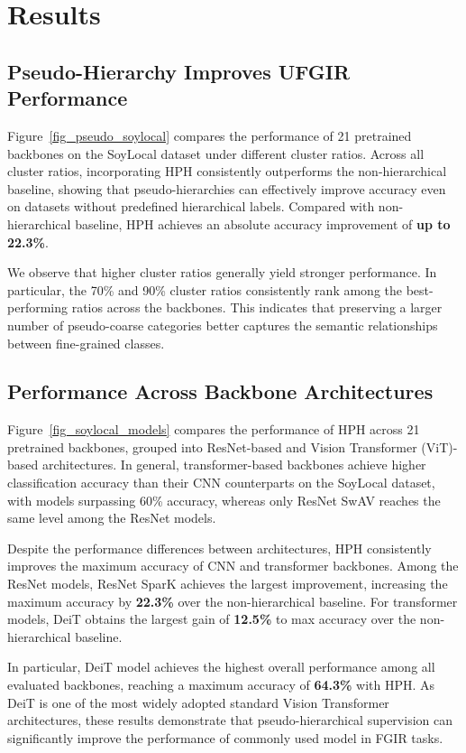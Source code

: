 \documentclass[conference,a4paper]{IEEEtran}
\begin{document}
\section{Results}
\label{sec_results}
\subsection{Pseudo-Hierarchy Improves UFGIR Performance}
Figure~\ref{fig_pseudo_soylocal} compares the performance of 21 pretrained backbones on the SoyLocal dataset under different cluster ratios. Across all cluster ratios, incorporating HPH consistently outperforms the non-hierarchical baseline, showing that pseudo-hierarchies can effectively improve accuracy even on datasets without predefined hierarchical labels. Compared with non-hierarchical baseline, HPH achieves an absolute accuracy improvement of \textbf{up to 22.3\%}.

We observe that higher cluster ratios generally yield stronger performance. In particular, the 70\% and 90\% cluster ratios consistently rank among the best-performing ratios across the backbones. This indicates that preserving a larger number of pseudo-coarse categories better captures the semantic relationships between fine-grained classes.

\subsection{Performance Across Backbone Architectures}
Figure~\ref{fig_soylocal_models} compares the performance of HPH across 21 pretrained backbones, grouped into ResNet-based and Vision Transformer (ViT)-based architectures. In general, transformer-based backbones achieve higher classification accuracy than their CNN counterparts on the SoyLocal dataset, with models surpassing 60\% accuracy, whereas only ResNet SwAV reaches the same level among the ResNet models.

Despite the performance differences between architectures, HPH consistently improves the maximum accuracy of CNN and transformer backbones. Among the ResNet models, ResNet SparK achieves the largest improvement, increasing the maximum accuracy by \textbf{22.3\%} over the non-hierarchical baseline. For transformer models, DeiT obtains the largest gain of \textbf{12.5\%} to max accuracy over the non-hierarchical baseline.

In particular, DeiT model achieves the highest overall performance among all evaluated backbones, reaching a maximum accuracy of \textbf{64.3\%} with HPH. As DeiT is one of the most widely adopted standard Vision Transformer architectures, these results demonstrate that pseudo-hierarchical supervision can significantly improve the performance of commonly used model in FGIR tasks.
\end{document}
